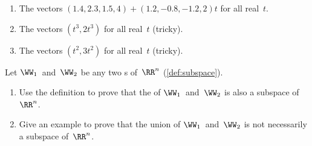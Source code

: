 \begin{exercise}
\begin{enumerate}

\item The vectors \((1.4,2.3,1.5,4)+(1.2,-0.8,-1.2,2)t\) for all real~\(t\).

\item The vectors \((t^3,2t^3)\) for all real~\(t\) (tricky).

\item The vectors \((t^2,3t^2)\) for all real~\(t\) (tricky).

\end{enumerate}
\end{exercise}





\begin{exercise}  
Let \(\WW_1\)\ and~\(\WW_2\) be any two s of~\(\RR^n\) (\cref{def:subspace}).  
\begin{enumerate}
\item Use the definition to prove that the  of \(\WW_1\)\ and~\(\WW_2\) is also a subspace of~\(\RR^n\).
\item Give an example to prove that the union of \(\WW_1\)\ and~\(\WW_2\) is not necessarily a subspace of~\(\RR^n\).
\end{enumerate}
\end{exercise}





